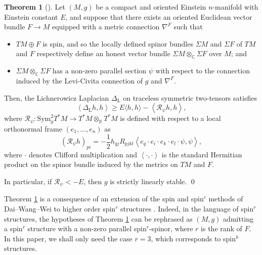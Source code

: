 \documentclass[oneside,12pt]{amsart}
\theoremstyle{definition}
\newtheorem{theorem}[lemma]{Theorem}
\numberwithin{equation}{section}
\begin{document}
\begin{theorem}[\cite{A25}]\label{thm:criterion}
Let $(M,g)$ be a compact and oriented Einstein $n$-manifold with Einstein constant $E$, and suppose that there exists an oriented Euclidean vector bundle $F \to M$ equipped with a metric connection $\nabla^F$ such that 
\begin{itemize}
    \item $TM \oplus F$ is spin, and so the locally defined spinor bundles $\Sigma M$ and $\Sigma F$ of $TM$ and $F$ respectively define an honest vector bundle $\Sigma M \otimes_{\mathbb{C}} \Sigma F$ over $M$; and
    \item $\Sigma M \otimes_{\mathbb{C}} \Sigma F$ has a non-zero parallel section $\psi$ with respect to the connection induced by the Levi-Civita connection of $g$ and $\nabla^F$. 
\end{itemize}
Then, the Lichnerowicz Laplacian $\Delta_{\mathrm{L}}$ on traceless symmetric two-tensors satisfies 
    \[
    \left\langle \Delta_{\mathrm{L}} h , h \right\rangle \geq E \langle h , h \rangle - \left \langle \mathcal{R}_{\psi} h , h \right \rangle ,
    \]
    where $\mathcal{R}_{\psi} \colon \mathrm{Sym}_0^2 T^*M \to T^*M \otimes_{\mathbb{R}} T^*M$ is defined with respect to a local orthonormal frame $(e_1 , \dots , e_n)$ as 
    \begin{equation}\label{eq:rpsi_def}
    (\mathcal{R}_{\psi} h)_{pi} = -\frac{1}{2} h_{qj} R_{pjkl} \left\langle e_q \cdot e_i \cdot e_k \cdot e_l \cdot \psi , \psi \right\rangle , 
    \end{equation}
    where $\cdot$ denotes Clifford multiplication and $\left\langle \cdot , \cdot \right\rangle$ is the standard Hermitian product on the spinor bundle induced by the metrics on $TM$ and $F$.
    
    In particular, if $\mathcal{R}_{\psi} < -E$, then $g$ is strictly linearly stable. \qed
\end{theorem} 

Theorem \ref{thm:criterion} is a consequence of an extension of the spin \cite{DWW05} and spin$^c$ \cite{DWW07} methods of Dai--Wang--Wei to higher order spin$^r$ structures \cite{EH16}. Indeed, in the language of spin$^r$ structures, the hypotheses of Theorem \ref{thm:criterion} can be rephrased as $(M,g)$ admitting a spin$^r$ structure with a non-zero parallel spin$^r$-spinor, where $r$ is the rank of $F$. In this paper, we shall only need the case $r = 3$, which corresponds to spin$^h$ structures. 
\end{document}
